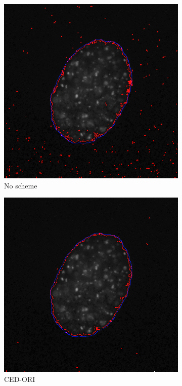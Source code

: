 \documentclass[a4paper,11pt]{ijamas}
\begin{document}
{\begin{figure}
\begin{subfigure}{.25\textwidth}
  \centering
  \includegraphics[width=0.80\columnwidth]{./figs/results/4no.jpg}
 \caption{No scheme}
  \label{fig:noseg_4}
\end{subfigure}%
\begin{subfigure}{.25\textwidth}
  \centering
  \includegraphics[width=0.80\columnwidth]{./figs/results/4ced.jpg}
 \caption{CED-ORI}
  \label{fig:cedseg_4}
\end{subfigure}%
\begin{subfigure}{.25\textwidth}
  \centering

\end{subfigure}
\end{figure}}
\end{document}
